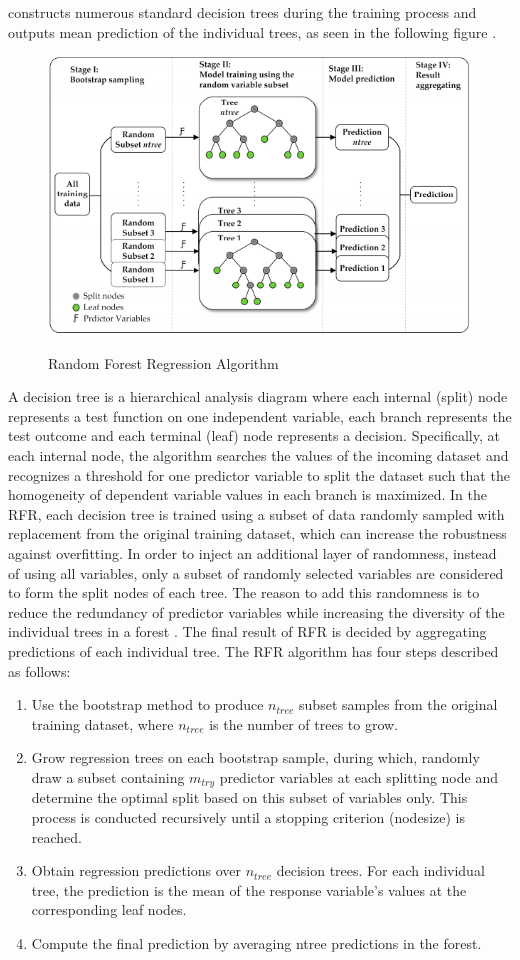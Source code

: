 constructs numerous standard decision trees during the training process and outputs mean prediction of
the individual trees, as seen in the following figure \cite{xu2019water}. 
\begin{figure}[htbp]
\centering
\includegraphics[width=0.9\linewidth]{project/rf2.PNG}
\label{fig:felix}
\caption{Random Forest Regression Algorithm}
\end{figure}
\newpage
A decision tree is a hierarchical analysis diagram where each internal (split) node represents a test function on one independent variable, each branch represents the test outcome and each terminal (leaf) node represents a decision. Specifically, at each internal node, the algorithm searches the values of the incoming dataset and recognizes a threshold for one predictor variable to split the dataset such that the homogeneity of dependent variable values in each branch is maximized. In the RFR, each decision tree is trained using a subset of data randomly sampled with replacement from the original training dataset, which can increase the robustness against overfitting. In order to inject an additional layer of randomness, instead of using all variables, only a subset of randomly selected variables are considered to form the split nodes of each tree. The reason to add this randomness is to reduce the redundancy of predictor variables while increasing the diversity of the individual trees in a forest \cite{breiman2001random}. The final result of RFR is decided by aggregating predictions of each individual tree. The RFR algorithm has four steps described as follows:
\begin{enumerate}
    \item Use the bootstrap method to produce $n_{tree}$ subset samples from the original training dataset,
where $n_{tree}$ is the number of trees to grow.
    \item Grow regression trees on each bootstrap sample, during which, randomly draw a subset
containing $m_{try}$ predictor variables at each splitting node and determine the optimal split based
on this subset of variables only. This process is conducted recursively until a stopping criterion
(nodesize) is reached.
    \item Obtain regression predictions over $n_{tree}$ decision trees. For each individual tree, the prediction is the mean of the response variable's values at the corresponding leaf nodes.
    \item Compute the final prediction by averaging ntree predictions in the forest.
\end{enumerate}

